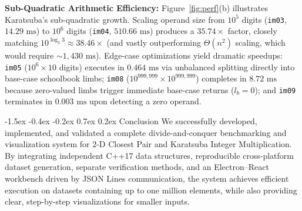 \documentclass[10pt,twocolumn]{article}
\makeatletter
\renewcommand\section{\@startsection{section}{1}{\z@}%
  {-1.5ex \@plus -0.4ex \@minus -0.2ex}%
  {0.7ex \@plus 0.2ex}%
  {\normalfont\normalsize\bfseries}}
\makeatother
\begin{document}
\textbf{Sub-Quadratic Arithmetic Efficiency:} Figure~\ref{fig:perf}(b) illustrates Karatsuba's sub-quadratic growth. Scaling operand size from $10^5$ digits (\texttt{im03}, $14.29\text{ ms}$) to $10^6$ digits (\texttt{im04}, $510.66\text{ ms}$) produces a $35.74\times$ factor, closely matching $10^{\log_2 3} \approx 38.46\times$ (and vastly outperforming $\Theta(n^2)$ scaling, which would require $\sim 1{,}430\text{ ms}$). Edge-case optimizations yield dramatic speedups: \texttt{im05} ($10^6 \times 10$ digits) executes in $0.464\text{ ms}$ via unbalanced splitting directly into base-case schoolbook limbs; \texttt{im08} ($10^{999{,}999} \times 10^{999{,}999}$) completes in $8.72\text{ ms}$ because zero-valued limbs trigger immediate base-case returns ($l_b = 0$); and \texttt{im09} terminates in $0.003\text{ ms}$ upon detecting a zero operand.\newline

\section{Conclusion}
We successfully developed, implemented, and validated a complete divide-and-conquer benchmarking and visualization system for 2-D Closest Pair and Karatsuba Integer Multiplication. By integrating independent C++17 data structures, reproducible cross-platform dataset generation, separate verification methods, and an Electron--React workbench driven by JSON Lines communication, the system achieves efficient execution on datasets containing up to one million elements, while also providing clear, step-by-step visualizations for smaller inputs.\newline



\end{document}
